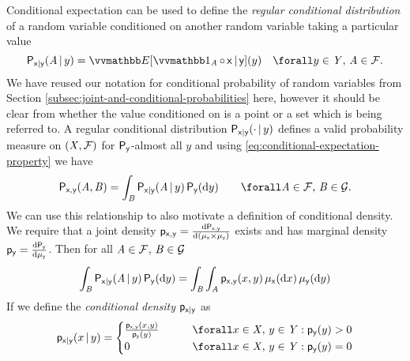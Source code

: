 Conditional expectation can be used to define the \emph{regular conditional distribution} of a random variable conditioned on another random variable taking a particular value
\begin{equation}\label{eq:regular-conditional-probability}
  \prob{\rvar{x}|\rvar{y}}(\set{A} \gvn y) = \expc{\ind{\set{A}}\circ\,\rvar{x} \gvn \rvar{y}}(y)
  \quad\forall y \in \set{Y},\,\set{A} \in \sset{F}.
\end{equation}
We have reused our notation for conditional probability of random variables from Section \ref{subsec:joint-and-conditional-probabilities} here, however it should be clear from whether the value conditioned on is a point or a set which is being referred to. A regular conditional distribution $\mathsf{P}_{\mathsf{x}|\mathsf{y}}(\cdot\operatorname{|} y)$ defines a valid probability measure on $(\mathit{X},\mathcal{F})$ for $\mathsf{P}_{\mathsf{y}}$-almost all $y$ and using \eqref{eq:conditional-expectation-property} we have
\begin{equation}\label{eq:regular-conditional-probability-joint-relationship}
  \prob{\rvar{x},\rvar{y}}(\set{A},\set{B}) =
  \int_{\set{B}} \prob{\rvar{x}|\rvar{y}}(\set{A}\gvn y) \,\prob{\rvar{y}}(\dr y)
  \qquad \forall \set{A} \in \sset{F},\,\set{B} \in \sset{G}.
\end{equation}
We can use this relationship to also motivate a definition of conditional density. We require that a joint density $\mathsf{p}_{\mathsf{x},\mathsf{y}} = \frac{\mathrm{d} \mathsf{P}_{\mathsf{x},\mathsf{y}}}{\mathrm{d} (\mu_{\mathsf{x}}\times\mu_{\mathsf{y}})}$ exists and has marginal density $\mathsf{p}_{\mathsf{y}} = \frac{\mathrm{d} \mathsf{P}_{\mathsf{y}}}{\mathrm{d} \mu_{\mathsf{y}}}$. Then for all $\mathit{A} \in \mathcal{F}$, $\mathit{B} \in \mathcal{G}$
\begin{equation}\label{eq:conditional-density-derivation-1}
  \int_{\mathit{B}} \mathsf{P}_{\mathsf{x}|\mathsf{y}}(\mathit{A}\operatorname{|} y) \,\mathsf{P}_{\mathsf{y}}(\mathrm{d} y)
  =
  \int_{\mathit{B}}\int_{\mathit{A}} 
    \mathsf{p}_{\mathsf{x},\mathsf{y}}(x,y)
  \,\mu_{\mathsf{x}}(\mathrm{d} x)\,\mu_{\mathsf{y}}(\mathrm{d} y)
\end{equation}
If we define the \emph{conditional density} $\mathsf{p}_{\mathsf{x}|\mathsf{y}}$ as
\begin{equation}\label{eq:conditional-density-definition}
  \pden{\rvar{x}|\rvar{y}}(x\gvn y) =
  \begin{cases}
    \frac{\pden{\rvar{x},\rvar{y}}(x,y)}{\pden{\rvar{y}}(y)} 
    &\qquad \forall x\in\set{X},\, y \in \set{Y} : \pden{\rvar{y}}(y) > 0\\
    0
    &\qquad \forall x\in\set{X},\,y \in \set{Y} : \pden{\rvar{y}}(y) = 0
  \end{cases}
\end{equation}

